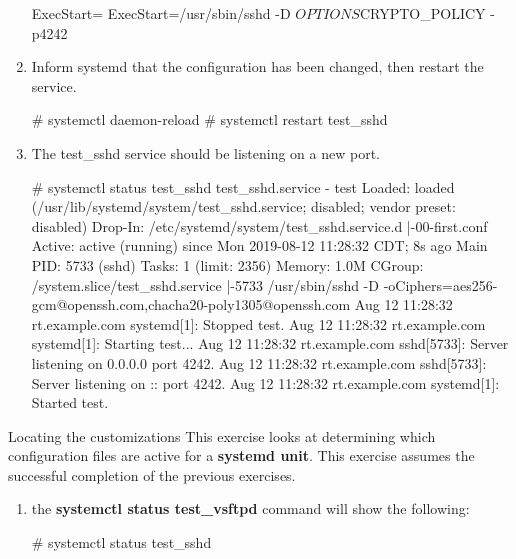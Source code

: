 \begin{Lab}
\begin{exe}
\begin{enumerate}
\begin{raw}
[Service]
ExecStart=
ExecStart=/usr/sbin/sshd -D $OPTIONS $CRYPTO_POLICY -p4242
		\end{raw}

		\item 
		Inform systemd that the configuration has been changed, then restart the service.
		\begin{raw}
# systemctl daemon-reload 
# systemctl restart test_sshd 
		\end{raw} 

		\item 
		The test\_sshd service should be listening on a new port. 
		\begin{rawfootnotesize} 
# systemctl status   test_sshd
 test_sshd.service - test
   Loaded: loaded (/usr/lib/systemd/system/test_sshd.service; disabled; vendor preset: disabled)
  Drop-In: /etc/systemd/system/test_sshd.service.d
           |-00-first.conf
   Active: active (running) since Mon 2019-08-12 11:28:32 CDT; 8s ago
 Main PID: 5733 (sshd)
    Tasks: 1 (limit: 2356)
   Memory: 1.0M
   CGroup: /system.slice/test_sshd.service
           |-5733 /usr/sbin/sshd -D -oCiphers=aes256-gcm@openssh.com,chacha20-poly1305@openssh.com
Aug 12 11:28:32 rt.example.com systemd[1]: Stopped test.
Aug 12 11:28:32 rt.example.com systemd[1]: Starting test...
Aug 12 11:28:32 rt.example.com sshd[5733]: Server listening on 0.0.0.0 port 4242.
Aug 12 11:28:32 rt.example.com sshd[5733]: Server listening on :: port 4242.
Aug 12 11:28:32 rt.example.com systemd[1]: Started test.
		\end{rawfootnotesize}



		\end{enumerate}
		\end{exe}


\begin{exe}{Locating the customizations}
	This exercise looks at determining which configuration 
	files are active for a \textbf{systemd unit}. This exercise assumes 
	the successful completion of the previous exercises. 

	\begin{enumerate}
		\item the \textbf{systemctl status test\_vsftpd} command will 
		show the following: 
	\begin{raw}
# systemctl status test_sshd
	\end{raw}


\end{enumerate}
\end{exe}
\end{Lab}
